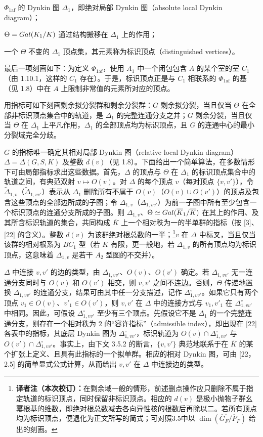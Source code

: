 $\Phi_{1\mathrm{af}}$ 的 Dynkin 图 $\Delta_1$，即绝对局部 Dynkin 图（absolute local Dynkin diagram）；

$\Theta=Gal(K_1/K)$ 通过结构搬移在 $\Delta_1$ 上的作用；

一个 $\Theta$ 不变的 $\Delta_1$ 顶点集，其元素称为标识顶点（distinguished vertices）。

最后一项刻画如下：为定义 $\Phi_{1\mathrm{af}}$，使用 $A_1$ 中一个闭包包含 $A$ 的某个室的室 $C_1$（由 1.10.1，这样的 $C_1$ 存在）。于是，标识顶点正是与 $C_1$ 相联系的 $\Phi_{1\mathrm{af}}$ 的基（见 1.8）中在 $A$ 上限制非常值的元素所对应的顶点。

用指标可如下刻画剩余拟分裂群和剩余分裂群：$G$ 剩余拟分裂，当且仅当 $\Theta$ 在全部非标识顶点集合中的轨道，是 $\Delta_1$ 的完整连通分支之并；$G$ 剩余分裂，当且仅当 $\Theta$ 在 $\Delta_1$ 上平凡作用，$\Delta_1$ 的全部顶点均为标识顶点，且 $G$ 的连通中心的最小分裂域完全分歧。

$G$ 的指标唯一确定其相对局部 Dynkin 图（relative local Dynkin diagram）$\Delta=\Delta(G,S,K)$ 及整数 $d(v)$（见 1.8）。下面给出一个简单算法，在多数情形下可由局部指标求出这些数据。首先，$\Delta$ 的顶点与 $\Theta$ 在 $\Delta_1$ 的标识顶点集合中的轨道之间，有典范双射 $v\mapsto O(v)$。对 $\Delta$ 的每个顶点 $v$（每对顶点 $\{v,v'\}$），令 $\widetilde\Delta_{1,v}$（$\widetilde\Delta_{1,vv'}$）表示从 $\Delta_1$ 删除所有不属于 $O(v)$（$O(v)\cup O(v')$）的顶点及包含这些顶点的全部边所成的子图；令 $\Delta_{1,v}$（$\Delta_{1,vv'}$）为前一子图中所有至少包含一个标识顶点的连通分支所成的子图。则 $\Delta_{1,v}$、$\Theta\simeq Gal(\overline K_1/\overline K)$ 在其上的作用、及其所含标识轨道的集合，共同构成 $\overline K$ 上一个相对秩为一的半单群的指标（按 [3]、[22] 的含义）。整数 $d(v)$ 为该群绝对根总数的一半；\footnote{\textbf{译者注（本次校订）：}在剩余域一般的情形，前述删点操作应只删除不属于指定轨道的标识顶点，同时保留非标识顶点。相应的 $d(v)$ 是极小抛物子群幺幂根基的维数，即绝对根总数减去各向异性核的根数后再除以二。若所有顶点均为标识顶点，便退化为正文所写的简式；可对照3.5中以 $\dim(\overline G_F^\circ/\overline P_F)$ 给出的刻画。}$v$ 在 $\Delta$ 中标叉，当且仅当该群的相对根系为 $BC_1$ 型（若 $\overline K$ 有限，更一般地，若 $\Delta_{1,v}$ 的所有顶点均为标识顶点，这意味着 $\Delta_{1,v}$ 是若干 $A_2$ 型图的不交并）。

$\Delta$ 中连接 $v,v'$ 的边的类型，由 $\Delta_{1,vv'}$、$O(v)$、$O(v')$ 确定。若 $\Delta_{1,vv'}$ 无一连通分支同时与 $O(v)$ 和 $O(v')$ 相交，则 $v,v'$ 之间不连边。否则，$\Theta$ 传递地置换 $\Delta_{1,vv'}$ 的连通分支，结果可由其中任一分支描述，记作 $\Delta_{1,vv'}^\circ$。如果它只有两个顶点 $v_1\in O(v)$、$v'_1\in O(v')$，则 $v,v'$ 在 $\Delta$ 中的连接方式与 $v_1,v'_1$ 在 $\Delta_{1,vv'}^\circ$ 中相同。因此，可假设 $\Delta_{1,vv'}^\circ$ 至少有三个顶点。先假设它不是 $\Delta_1$ 的一个完整连通分支，则存在一个相对秩为 $2$ 的“容许指标”（admissible index），即出现在 [22] 各表中的指标，其底层 Dynkin 图为 $\Delta_{1,vv'}^\circ$，标识轨道为 $O(v)\cap\Delta_{1,vv'}^\circ$ 与 $O(v')\cap\Delta_{1,vv'}^\circ$。事实上，由下文 3.5.2 的断言，$\{v,v'\}$ 典范地联系于在 $\overline K$ 的某个扩张上定义、且具有此指标的一个拟单群。相应的相对 Dynkin 图，可由 [22，2.5] 的简单显式公式计算，从而给出 $v,v'$ 在 $\Delta$ 中连接边的类型。

